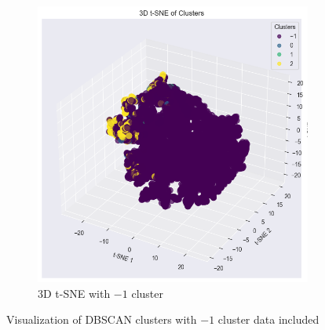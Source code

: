 \begin{figure}[H]
\begin{subfigure}[b]{0.45\textwidth}
        \includegraphics[width=1.0\textwidth]{src/figs/3d_t-SNE_DBSCAN_with.png} 
        \caption{3D t-SNE with $-1$ cluster}\label{fig:DBSCAN_tsne_with}
    \end{subfigure}
    \caption{Visualization of DBSCAN clusters with $-1$ cluster data included}\label{fig:with_outliers}
    \hspace*{\fill}
\end{figure}

